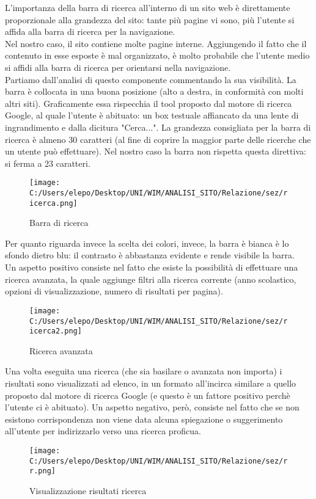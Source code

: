 L'importanza della barra di ricerca all'interno di un sito web è direttamente proporzionale alla grandezza del sito: tante più pagine vi sono, più l'utente si affida alla barra di ricerca per la navigazione. \\
Nel nostro caso, il sito contiene molte pagine interne. Aggiungendo il fatto che il contenuto in esse esposte è mal organizzato, è molto probabile che l'utente medio si affidi alla barra di ricerca per orientarsi nella navigazione.\\
Partiamo dall'analisi di questo componente commentando la sua visibilità. La barra è collocata in una buona posizione (alto a destra, in conformità con molti altri siti). Graficamente essa rispecchia il tool proposto dal motore di ricerca Google, al quale l'utente è abituato: un box testuale affiancato da una lente di ingrandimento e dalla dicitura "Cerca...". La grandezza consigliata per la barra di ricerca è almeno 30 caratteri (al fine di coprire la maggior parte delle ricerche che un utente può effettuare). Nel nostro caso la barra non rispetta questa direttiva: si ferma a 23 caratteri.\\

\begin{center}
\begin{figure}[h!]
           \begin{center}
           \texttt{[image: C:/Users/elepo/Desktop/UNI/WIM/ANALISI\_SITO/Relazione/sez/ricerca.png]}
           \caption{Barra di ricerca}
           \end{center}
  \end{figure}
\end{center}
Per quanto riguarda invece la scelta dei colori, invece, la barra è bianca è lo sfondo dietro blu: il contrasto è abbastanza evidente e rende visibile la barra.\\
Un aspetto positivo consiste nel fatto che esiste la possibilità di effettuare una ricerca avanzata, la quale aggiunge filtri alla ricerca corrente (anno scolastico, opzioni di visualizzazione, numero di risultati per pagina).\\
\begin{center}
\begin{figure}[h!]
           \begin{center}
           \texttt{[image: C:/Users/elepo/Desktop/UNI/WIM/ANALISI\_SITO/Relazione/sez/ricerca2.png]}
           \caption{Ricerca avanzata}
           \end{center}
  \end{figure}
\end{center}
Una volta eseguita una ricerca (che sia basilare o avanzata non importa) i risultati sono visualizzati ad elenco, in un formato all'incirca similare a quello proposto dal motore di ricerca Google (e questo è un fattore positivo perchè l'utente ci è abituato). Un aspetto negativo, però, consiste nel fatto che se non esistono corrispondenza non viene data alcuna spiegazione o suggerimento all'utente per indirizzarlo verso una ricerca proficua.

\begin{center}
\begin{figure}[h!]
           \begin{center}
           \texttt{[image: C:/Users/elepo/Desktop/UNI/WIM/ANALISI\_SITO/Relazione/sez/rr.png]}
           \caption{Visualizzazione risultati ricerca}
           \end{center}
  \end{figure}
\end{center}